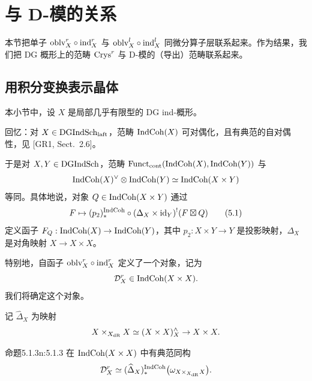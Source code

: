 \chapter{与 D-模的关系}

本节把单子 $\mathrm{oblv}^r_X\circ\mathrm{ind}^r_X$ 与 $\mathrm{oblv}^l_X\circ\mathrm{ind}^l_X$ 同微分算子层联系起来。作为结果，我们把 DG 概形上的范畴 $\mathrm{Crys}^r$ 与 D-模的（导出）范畴联系起来。

\section{用积分变换表示晶体}

本小节中，设 $X$ 是局部几乎有限型的 DG ind-概形。

回忆：对 $X\in\mathrm{DGIndSch}_{\mathrm{laft}}$，范畴 $\mathrm{IndCoh}(X)$ 可对偶化，且有典范的自对偶性，见 [GR1, Sect.~2.6]。

于是对 $X,Y\in\mathrm{DGIndSch}$，范畴 $\mathrm{Funct}_{\mathrm{cont}}(\mathrm{IndCoh}(X),\mathrm{IndCoh}(Y))$ 与
\[
\mathrm{IndCoh}(X)^{\vee}\otimes\mathrm{IndCoh}(Y)\simeq\mathrm{IndCoh}(X\times Y)
\]
等同。具体地说，对象 $Q\in\mathrm{IndCoh}(X\times Y)$ 通过
\begin{equation}
F\mapsto (p_2)_*^{\mathrm{IndCoh}}\circ(\Delta_X\times\mathrm{id}_Y)^!(F\boxtimes Q)\tag{5.1}
\end{equation}
定义函子 $F_Q:\mathrm{IndCoh}(X)\to\mathrm{IndCoh}(Y)$，其中 $p_2:X\times Y\to Y$ 是投影映射，$\Delta_X$ 是对角映射 $X\to X\times X$。

特别地，自函子 $\mathrm{oblv}^r_X\circ\mathrm{ind}^r_X$ 定义了一个对象，记为
\[
\mathcal{D}^r_X\in\mathrm{IndCoh}(X\times X).
\]
我们将确定这个对象。

记 $\widehat{\Delta}_X$ 为映射
\[
X\times_{X_{\mathrm{dR}}}X\simeq(X\times X)^{\wedge}_X\to X\times X.
\]

\begin{othm}{命题}{5.1.3}{n:5.1.3}
在 $\mathrm{IndCoh}(X\times X)$ 中有典范同构
\[
\mathcal{D}^r_X\simeq(\widehat{\Delta}_X)_*^{\mathrm{IndCoh}}\big(\omega_{X\times_{X_{\mathrm{dR}}}X}\big).
\]
\end{othm}

